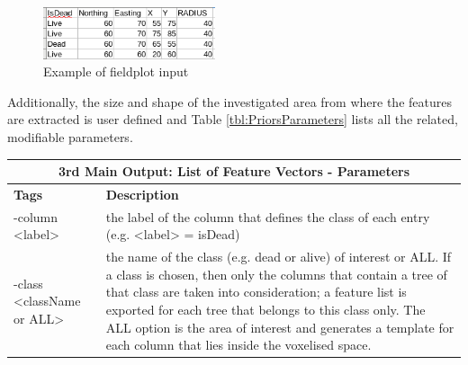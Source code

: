 \documentclass{subfiles}
\begin{document}
		  \begin{figure} [h!]
		  	\centering
		  	\includegraphics[width=0.45\textwidth]{tex/Appendices/img/fieldplot}
		  	\caption{Example of fieldplot input}
		  	\label{fig:fieldplot}
		  \end{figure}	
		
		\par Additionally, the size and shape of the investigated area from where the features are extracted is user defined and Table \ref{tbl:PriorsParameters} lists all the related, modifiable parameters.
		
					\newpage
			\begin{longtable}
				{|p{3.1cm}|p{11cm}|}
				
				\toprule
				\multicolumn{2}{|c|}{\textbf{3rd Main Output: List of Feature Vectors - Parameters }} \\
				\midrule
				
				\textbf{Tags} & \textbf{Description} \\ 
				\cmidrule(r){1-1}\cmidrule(l){2-2}
				-column <label> & the label of the column that defines the class of each entry (e.g. <label> = isDead) \\
				\cmidrule(r){1-1}\cmidrule(l){2-2}
				-class <className or ALL> & the name of the class (e.g. dead or alive) of interest or ALL. If a class is chosen, then only the columns that contain a tree of that class are taken into consideration; a feature list is exported for each tree that belongs to this class only. The ALL option is the area of interest and generates a template for each column that lies inside the voxelised space. \\
				

\end{longtable}
\end{document}
